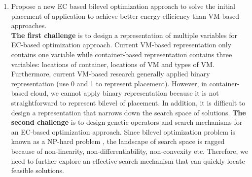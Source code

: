 \begin{enumerate}





	\item Propose a new EC based bilevel optimization approach to solve the initial placement of application to achieve better energy efficiency than VM-based approaches.\\

	 \textbf{The first challenge} is to design a representation of multiple variables for EC-based optimization approach. Current VM-based representation only contains one variable while container-based representation contains three variables: locations of container, locations of VM and types of VM. Furthermore, current VM-based research generally applied binary representation (use 0 and 1 to represent placement). However, in container-based cloud, we cannot apply binary representation because it is not straightforward to represent bilevel of placement. 
	In addition, it is difficult to design a representation that narrows down the search space of solutions.  \textbf{The second challenge} is to design genetic operators and search mechanisms for an EC-based optimization approach. Since bilevel optimization problem is known as a NP-hard problem \cite{Mathieu:2011dw}, the landscape of search space is ragged because of non-linearity, non-differentiability, non-convexity etc. Therefore, we need to further explore an effective search mechanism that can quickly locate feasible solutions.


\end{enumerate}
